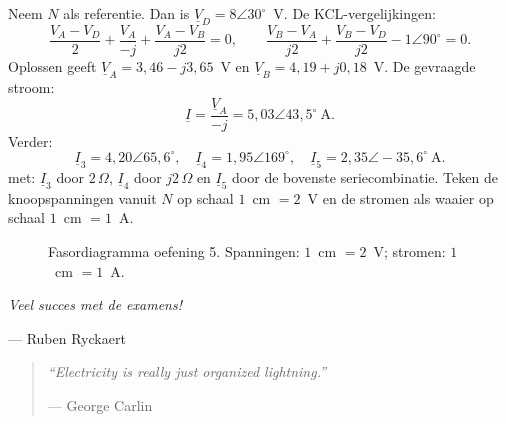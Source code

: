 \documentclass[a4paper,11pt]{article}
\begin{document}
\begin{oefenblok}
    Neem $N$ als referentie. Dan is $\underline{V}_D=8\angle30^\circ$~V. De KCL-vergelijkingen:
    \[
        \frac{V_A-V_D}{2}+\frac{V_A}{-j}+\frac{V_A-V_B}{j2}=0,\qquad
        \frac{V_B-V_A}{j2}+\frac{V_B-V_D}{j2}-1\angle90^\circ=0.
    \]
    Oplossen geeft $\underline{V}_A=3{,}46-j3{,}65$~V en
    $\underline{V}_B=4{,}19+j0{,}18$~V. De gevraagde stroom:
    \[
        \boxed{\underline{I}=\frac{\underline{V}_A}{-j}=5{,}03\angle43{,}5^\circ\ \text{A}}.
    \]
    Verder:
    \[
        \underline{I}_3=4{,}20\angle65{,}6^\circ,\quad
        \underline{I}_4=1{,}95\angle169^\circ,\quad
        \underline{I}_5=2{,}35\angle-35{,}6^\circ\ \text{A}.
    \]
    met: $\underline{I}_3$ door $2\,\Omega$, $\underline{I}_4$ door $j2\,\Omega$ en
    $\underline{I}_5$ door de bovenste seriecombinatie. Teken de knoopspanningen vanuit
    $N$ op schaal $1$~cm $=2$~V en de stromen als waaier op schaal $1$~cm $=1$~A.
    \begin{figure}[H]\centering
        \caption{Fasordiagramma oefening 5. Spanningen: $1$~cm $=2$~V; stromen: $1$~cm $=1$~A.}
    \end{figure}\FloatBarrier
\end{oefenblok}


\newpage
\thispagestyle{empty}
\vspace*{\fill}

\begin{center}
    \itshape\Huge
    Veel succes met de examens!
    \par\vspace{1cm}
    \normalfont\Large
    --- Ruben Ryckaert
\end{center}

\vspace{3cm}

\begin{quote}
    \centering
    \itshape\Large
    “Electricity is really just organized lightning.”
    \par\vspace{0.5cm}
    \textup{--- George Carlin}
\end{quote}

\vspace*{\fill}
\end{document}
